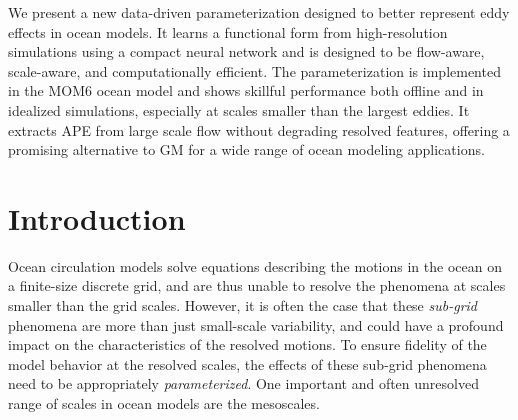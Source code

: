 \documentclass[draft]{agujournal2019}
\begin{document}
We present a new data-driven parameterization designed to better represent eddy effects in ocean models. It learns a functional form from high-resolution simulations using a compact neural network and is designed to be flow-aware, scale-aware, and computationally efficient. The parameterization is implemented in the MOM6 ocean model and shows skillful performance both offline and in idealized simulations, especially at scales smaller than the largest eddies. It extracts APE from large scale flow without degrading resolved features, offering a promising alternative to GM for a wide range of ocean modeling applications.

%
%

\section{Introduction}
Ocean circulation models solve equations describing the motions in the ocean on a finite-size discrete grid, and are thus unable to resolve the phenomena at scales smaller than the grid scales. However, it is often the case that these \textit{sub-grid} phenomena are more than just small-scale variability, and could have a profound impact on the characteristics of the resolved motions. To ensure fidelity of the model behavior at the resolved scales, the effects of these sub-grid phenomena need to be appropriately \textit{parameterized}. One important and often unresolved range of scales in ocean models are the mesoscales. 
\end{document}
